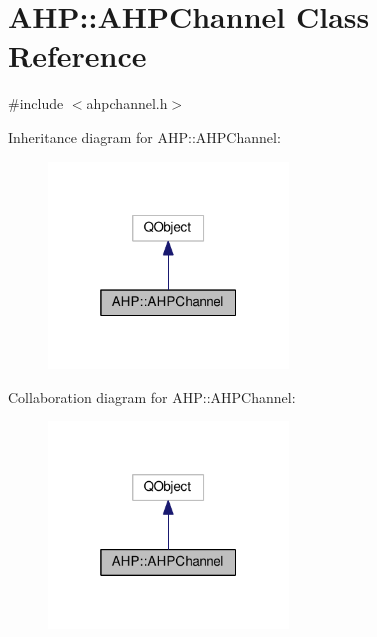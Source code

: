 \hypertarget{class_a_h_p_1_1_a_h_p_channel}{}\section{A\+H\+P\+:\+:A\+H\+P\+Channel Class Reference}
\label{class_a_h_p_1_1_a_h_p_channel}


{\ttfamily \#include $<$ahpchannel.\+h$>$}



Inheritance diagram for A\+H\+P\+:\+:A\+H\+P\+Channel\+:
\nopagebreak
\begin{figure}[H]
\begin{center}
\leavevmode
\includegraphics[width=181pt]{class_a_h_p_1_1_a_h_p_channel__inherit__graph}
\end{center}
\end{figure}


Collaboration diagram for A\+H\+P\+:\+:A\+H\+P\+Channel\+:
\nopagebreak
\begin{figure}[H]
\begin{center}
\leavevmode
\includegraphics[width=181pt]{class_a_h_p_1_1_a_h_p_channel__coll__graph}
\end{center}
\end{figure}
